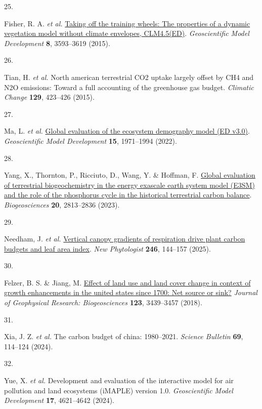 \documentclass[
  12pt,
  letterpaper,
  DIV=11,
  numbers=noendperiod]{scrartcl}
\newlength{\cslhangindent}
\newlength{\csllabelwidth}
\newenvironment{CSLReferences}[2] %
 {\begin{list}{}{%
  \setlength{\itemindent}{0pt}
  \setlength{\leftmargin}{0pt}
  \setlength{\parsep}{0pt}
  \ifodd #1
   \setlength{\leftmargin}{\cslhangindent}
   \setlength{\itemindent}{-1\cslhangindent}
  \fi
  \setlength{\itemsep}{#2\baselineskip}}}
 {\end{list}}
\newcommand{\CSLLeftMargin}[1]{\parbox[t]{\csllabelwidth}{\strut#1\strut}}
\newcommand{\CSLRightInline}[1]{\parbox[t]{\linewidth - \csllabelwidth}{\strut#1\strut}}
\begin{document}
\begin{CSLReferences}{0}{0}
\CSLLeftMargin{25. }%
\CSLRightInline{Fisher, R. A. \emph{et al.}
\href{https://doi.org/10.5194/gmd-8-3593-2015}{Taking off the training
wheels: The properties of a dynamic vegetation model without climate
envelopes, CLM4.5(ED)}. \emph{Geoscientific Model Development}
\textbf{8}, 3593--3619 (2015).}

\CSLLeftMargin{26. }%
\CSLRightInline{Tian, H. \emph{et al.} North american terrestrial CO2
uptake largely offset by CH4 and N2O emissions: Toward a full accounting
of the greenhouse gas budget. \emph{Climatic Change} \textbf{129},
423--426 (2015).}

\CSLLeftMargin{27. }%
\CSLRightInline{Ma, L. \emph{et al.}
\href{https://doi.org/10.5194/gmd-15-1971-2022}{Global evaluation of the
ecosystem demography model (ED v3.0)}. \emph{Geoscientific Model
Development} \textbf{15}, 1971--1994 (2022).}

\CSLLeftMargin{28. }%
\CSLRightInline{Yang, X., Thornton, P., Ricciuto, D., Wang, Y. \&
Hoffman, F. \href{https://doi.org/10.5194/bg-20-2813-2023}{Global
evaluation of terrestrial biogeochemistry in the energy exascale earth
system model (E3SM) and the role of the phosphorus cycle in the
historical terrestrial carbon balance}. \emph{Biogeosciences}
\textbf{20}, 2813--2836 (2023).}

\CSLLeftMargin{29. }%
\CSLRightInline{{Needham, J. \emph{et al.}}
\href{https://doi.org/10.1111/nph.20423}{Vertical canopy gradients of
respiration drive plant carbon budgets and leaf area index}. \emph{New
Phytologist} \textbf{246}, 144--157 (2025).}

\CSLLeftMargin{30. }%
\CSLRightInline{Felzer, B. S. \& Jiang, M.
\href{https://doi.org/10.1029/2017JG004378}{Effect of land use and land
cover change in context of growth enhancements in the united states
since 1700: Net source or sink?} \emph{Journal of Geophysical Research:
Biogeosciences} \textbf{123}, 3439--3457 (2018).}

\CSLLeftMargin{31. }%
\CSLRightInline{Xia, J. Z. \emph{et al.} The carbon budget of china:
1980--2021. \emph{Science Bulletin} \textbf{69}, 114--124 (2024).}

\CSLLeftMargin{32. }%
\CSLRightInline{Yue, X. \emph{et al.} Development and evaluation of the
interactive model for air pollution and land ecosystems (iMAPLE) version
1.0. \emph{Geoscientific Model Development} \textbf{17}, 4621--4642
(2024).}


\end{CSLReferences}
\end{document}
